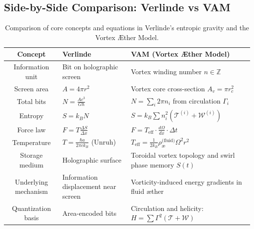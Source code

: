 \documentclass[preprint]{revtex4-2}
\begin{document}
            \subsection{Side-by-Side Comparison: Verlinde vs VAM}
            \begin{table}[H]
                \scriptsize
                \centering
                \renewcommand{\arraystretch}{1.3}
                \setlength{\tabcolsep}{10pt}
                \begin{tabular}{|c|p{5.0cm}|p{7cm}|}
                    \hline
                    \textbf{Concept} & \textbf{Verlinde} & \textbf{VAM (Vortex \AE ther Model)} \\
                    \hline
                    Information unit & Bit on holographic screen & Vortex winding number $n \in \mathbb{Z}$ \\
                    \hline
                    Screen area & $A = 4\pi r^2$ & Vortex core cross-section $A_v = \pi r_c^2$ \\
                    \hline
                    Total bits & $N = \frac{A c^3}{G \hbar}$ & $N = \sum_i 2\pi n_i$ from circulation $\Gamma_i$ \\
                    \hline
                    Entropy & $S = k_B N$ & $S = k_B \sum n_i^2 (\mathcal{T}^{(i)} + \mathcal{W}^{(i)})$ \\
                    \hline
                    Force law & $F = T \frac{\Delta S}{\Delta x}$ & $F = T_\text{eff} \cdot \frac{d\Omega}{dx} \cdot \Delta t$ \\
                    \hline
                    Temperature & $T = \frac{\hbar a}{2\pi c k_B}$ (Unruh) & $T_\text{eff} = \frac{1}{2k_B} \rho_{\text{\ae}}^{\text{(fluid)}} \Omega^2 r^2$ \\
                    \hline
                    Storage medium & Holographic surface & Toroidal vortex topology and swirl phase memory $S(t)$ \\
                    \hline
                    Underlying mechanism & Information displacement near screen & Vorticity-induced energy gradients in fluid æther \\
                    \hline
                    Quantization basis & Area-encoded bits & Circulation and helicity: $H = \sum \Gamma^2(\mathcal{T} + \mathcal{W})$ \\
                    \hline
                \end{tabular}
                \caption{Comparison of core concepts and equations in Verlinde’s entropic gravity and the Vortex \AE ther Model.}
                \label{tab:table}
            \end{table}
\end{document}
